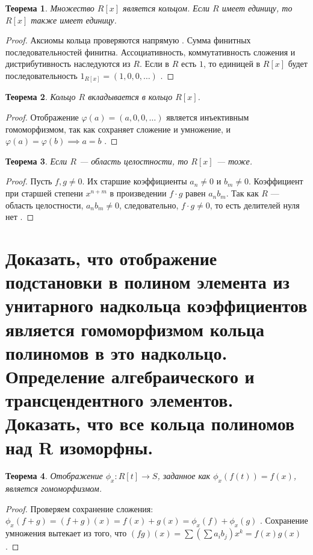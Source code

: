 \documentclass[12pt, a4paper]{article}
\theoremstyle{definition}
\theoremstyle{plain}
\newtheorem{theorem}{Теорема}[section]
\begin{document}
	\begin{theorem}
		Множество $R[x]$ является кольцом. Если $R$ имеет единицу, то $R[x]$ также имеет единицу.
	\end{theorem}
	\begin{proof}
		Аксиомы кольца проверяются напрямую . Сумма финитных последовательностей финитна. Ассоциативность, коммутативность сложения и дистрибутивность наследуются из $R$. Если в $R$ есть $1$, то единицей в $R[x]$ будет последовательность $1_{R[x]} = (1, 0, 0, \dots)$ .
	\end{proof}
	
	\begin{theorem}
		Кольцо $R$ вкладывается в кольцо $R[x]$.
	\end{theorem}
	\begin{proof}
		Отображение $\varphi(a) = (a, 0, 0, \dots)$ является инъективным гомоморфизмом, так как сохраняет сложение и умножение, и $\varphi(a) = \varphi(b) \implies a=b$ .
	\end{proof}
	
	\begin{theorem}
		Если $R$ — область целостности, то $R[x]$ — тоже.
	\end{theorem}
	\begin{proof}
		Пусть $f, g \neq 0$. Их старшие коэффициенты $a_n \neq 0$ и $b_m \neq 0$. Коэффициент при старшей степени $x^{n+m}$ в произведении $f \cdot g$ равен $a_n b_m$. Так как $R$ — область целостности, $a_n b_m \neq 0$, следовательно, $f \cdot g \neq 0$, то есть делителей нуля нет .
	\end{proof}
	
	\newpage
	
	\section{Доказать, что отображение подстановки в полином элемента из унитарного надкольца коэффициентов является гомоморфизмом кольца полиномов в это надкольцо. Определение алгебраического и трансцендентного элементов. Доказать, что все кольца полиномов над R изоморфны.}
	
	\begin{theorem}
		Отображение $\phi_x: R[t] \to S$, заданное как $\phi_x(f(t)) = f(x)$, является гомоморфизмом.
	\end{theorem}
	\begin{proof}
		Проверяем сохранение сложения: $\phi_x(f+g) = (f+g)(x) = f(x)+g(x) = \phi_x(f) + \phi_x(g)$ . Сохранение умножения вытекает из того, что $(fg)(x) = \sum (\sum a_i b_j) x^k = f(x)g(x)$ .
	\end{proof}
	
\end{document}
